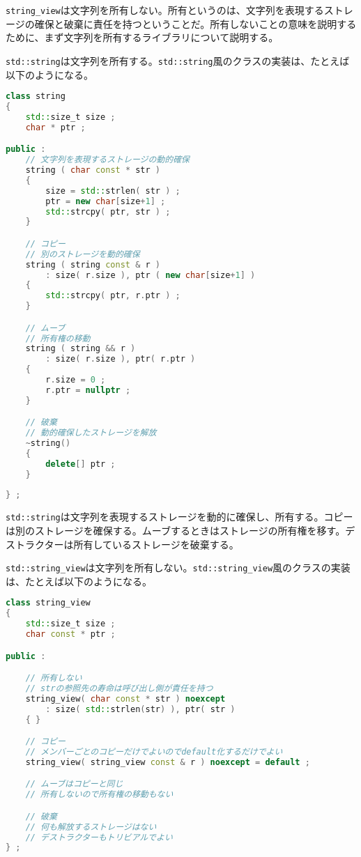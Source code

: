 %

\lstinline!string_view!は文字列を所有しない。所有というのは、文字列を表現するストレージの確保と破棄に責任を持つということだ。所有しないことの意味を説明するために、まず文字列を所有するライブラリについて説明する。

\lstinline!std::string!は文字列を所有する。\lstinline!std::string!風のクラスの実装は、たとえば以下のようになる。

\begin{lstlisting}[language=C++]
class string
{
    std::size_t size ;
    char * ptr ;

public :
    // 文字列を表現するストレージの動的確保
    string ( char const * str )
    {
        size = std::strlen( str ) ;
        ptr = new char[size+1] ;
        std::strcpy( ptr, str ) ;
    }

    // コピー
    // 別のストレージを動的確保
    string ( string const & r )
        : size( r.size ), ptr ( new char[size+1] )
    {
        std::strcpy( ptr, r.ptr ) ;
    }

    // ムーブ
    // 所有権の移動
    string ( string && r )
        : size( r.size ), ptr( r.ptr )
    {
        r.size = 0 ;
        r.ptr = nullptr ;
    }

    // 破棄
    // 動的確保したストレージを解放
    ~string()
    {
        delete[] ptr ;
    }
    
} ;
\end{lstlisting}

\lstinline!std::string!は文字列を表現するストレージを動的に確保し、所有する。コピーは別のストレージを確保する。ムーブするときはストレージの所有権を移す。デストラクターは所有しているストレージを破棄する。

\lstinline!std::string_view!は文字列を所有しない。\lstinline!std::string_view!風のクラスの実装は、たとえば以下のようになる。

\begin{lstlisting}[language=C++]
class string_view
{
    std::size_t size ;
    char const * ptr ;

public :

    // 所有しない
    // strの参照先の寿命は呼び出し側が責任を持つ
    string_view( char const * str ) noexcept
        : size( std::strlen(str) ), ptr( str )
    { }

    // コピー
    // メンバーごとのコピーだけでよいのでdefault化するだけでよい
    string_view( string_view const & r ) noexcept = default ;

    // ムーブはコピーと同じ
    // 所有しないので所有権の移動もない

    // 破棄
    // 何も解放するストレージはない
    // デストラクターもトリビアルでよい
} ;
\end{lstlisting}

